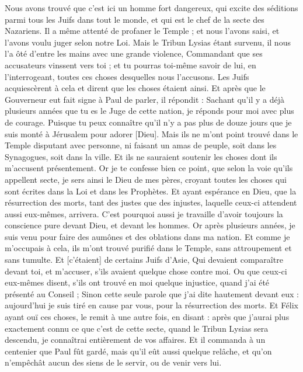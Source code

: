\begin{multicols}{2}
Nous avons trouvé que c'est ici un homme fort dangereux, qui excite des séditions parmi tous les Juifs dans tout le monde, et qui est le chef de la secte des Nazariens.
Il a même attenté de profaner le Temple ; et nous l'avons saisi, et l'avons voulu juger selon notre Loi.
Mais le Tribun Lysias étant survenu, il nous l'a ôté d'entre les mains avec une grande violence,
Commandant que ses accusateurs vinssent vers toi ; et tu pourras toi-même savoir de lui, en l'interrogeant, toutes ces choses desquelles nous l'accusons.
Les Juifs acquiescèrent à cela et dirent que les choses étaient ainsi.
Et après que le Gouverneur eut fait signe à Paul de parler, il répondit : Sachant qu'il y a déjà plusieurs années que tu es le Juge de cette nation, je réponds pour moi avec plus de courage.
Puisque tu peux connaître qu'il n'y a pas plus de douze jours que je suis monté à Jérusalem pour adorer [Dieu].
Mais ils ne m'ont point trouvé dans le Temple disputant avec personne, ni faisant un amas de peuple, soit dans les Synagogues, soit dans la ville.
Et ils ne sauraient soutenir les choses dont ils m'accusent présentement.
Or je te confesse bien ce point, que selon la voie qu'ils appellent secte, je sers ainsi le Dieu de mes pères, croyant toutes les choses qui sont écrites dans la Loi et dans les Prophètes.
Et ayant espérance en Dieu, que la résurrection des morts, tant des justes que des injustes, laquelle ceux-ci attendent aussi eux-mêmes, arrivera.
C'est pourquoi aussi je travaille d'avoir toujours la conscience pure devant Dieu, et devant les hommes.
Or après plusieurs années, je suis venu pour faire des aumônes et des oblations dans ma nation.
Et comme je m'occupais à cela, ils m'ont trouvé purifié dans le Temple, sans attroupement et sans tumulte.
Et [c'étaient] de certains Juifs d'Asie,
Qui devaient comparaître devant toi, et m'accuser, s'ils avaient quelque chose contre moi.
Ou que ceux-ci eux-mêmes disent, s'ils ont trouvé en moi quelque injustice, quand j'ai été présenté au Conseil ;
Sinon cette seule parole que j'ai dite hautement devant eux : aujourd'hui je suis tiré en cause par vous, pour la résurrection des morts.
Et Félix ayant ouï ces choses, le remit à une autre fois, en disant : après que j'aurai plus exactement connu ce que c'est de cette secte, quand le Tribun Lysias sera descendu, je connaîtrai entièrement de vos affaires.
Et il commanda à un centenier que Paul fût gardé, mais qu'il eût aussi quelque relâche, et qu'on n'empêchât aucun des siens de le servir, ou de venir vers lui.

\end{multicols}
